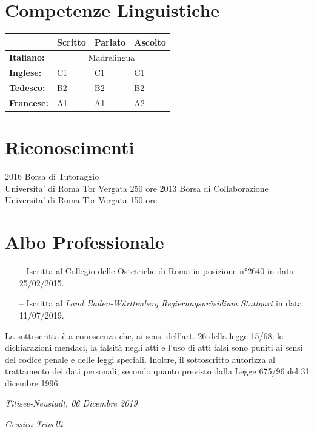\documentclass[11pt]{friggeri-cv}
\begin{document}
\newpage
\section{Competenze Linguistiche}
\begin{table}[!h]
  \centering
  \renewcommand{\arraystretch}{1.45}
  \begin{tabular}{ p{3cm} p{3cm} p{3cm} p{3cm} }
    \hline
    & \textbf{Scritto}  & \textbf{Parlato} & \textbf{Ascolto}     \\     \hline
    \textbf{Italiano:}  & \multicolumn{3}{c}{Madrelingua}         \\
    \textbf{Inglese:}   & C1 & C1 & C1                            \\ 
    \textbf{Tedesco:}   & B2 & B2 & B2                            \\ 
    \textbf{Francese:}  & A1 & A1 & A2                            \\    \hline
  \end{tabular}
\end{table}

\section{Riconoscimenti}
\begin{entrylist}
  \entry
    {2016}
    {Borsa di Tutoraggio}
    {\\Universita' di Roma Tor Vergata}
    {250 ore}
  \entry
    {2013}
    {Borsa di Collaborazione}
    {\\Universita' di Roma Tor Vergata}
    {150 ore}
\end{entrylist}

\vspace{-10pt}
\section{Albo Professionale}
\begin{itemize}
  \item[--] Iscritta al Collegio delle Ostetriche di Roma in posizione 
  n°2640 in data 25/02/2015.
  \item[--] Iscritta al \emph{Land Baden-W{\"u}rttenberg 
  Regierungspr{\"a}sidium Stuttgart} in data 11/07/2019.
\end{itemize}

\vspace{75pt}
\footnotesize La sottoscritta è a conoscenza che, ai sensi dell’art. 26 della legge 
15/68, le dichiarazioni mendaci, la falsità negli atti e l’uso di
atti falsi sono puniti ai sensi del codice penale e delle leggi speciali. Inoltre, il 
sottoscritto autorizza al trattamento dei dati
personali, secondo quanto previsto dalla Legge 675/96 del 31 dicembre 1996.

\vspace{75pt}
\begin{flushleft}
\large\emph{Titisee-Neustadt, 06 Dicembre 2019}
\end{flushleft}
\begin{flushright}
\large\emph{Gessica Trivelli}
\end{flushright}
\end{document}
